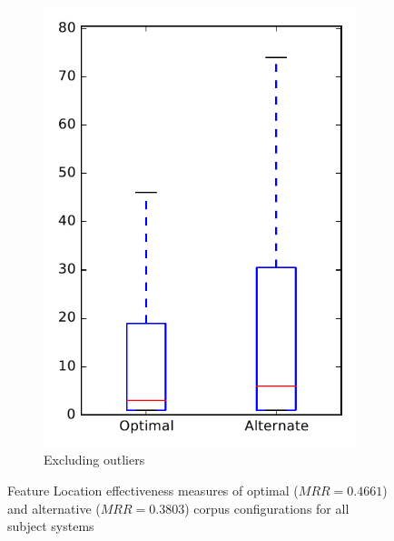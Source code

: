 \begin{figure}
\begin{subfigure}{.4\textwidth}
        \includegraphics[height=0.4\textheight]{figures/combo/flt_rq2_all_no_outlier}
        \caption{Excluding outliers}\label{fig:combo:flt:rq2:all_no_outlier}
    \end{subfigure}
\caption{Feature Location effectiveness measures of optimal ($MRR=0.4661$) and alternative ($MRR=0.3803$) corpus configurations for all subject systems}
\label{fig:combo:flt:rq2:all}
\end{figure}
